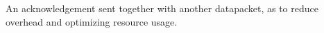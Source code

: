 An acknowledgement sent together with another datapacket, as to reduce overhead and optimizing resource usage.